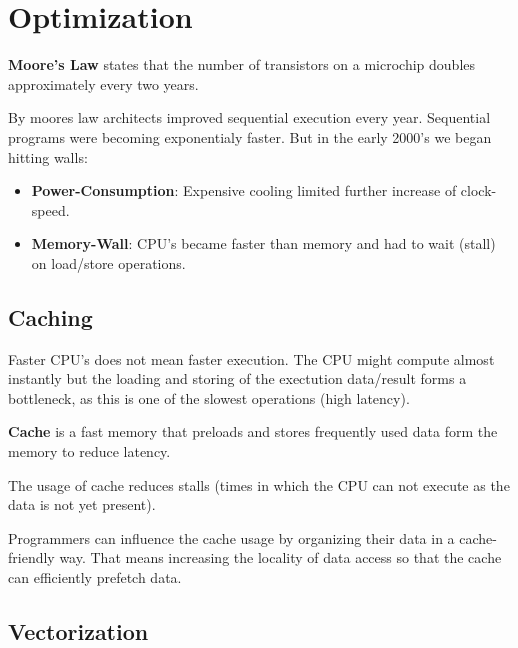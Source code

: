 \section{Optimization}

\begin{theorem}
    \textbf{Moore's Law} states that the number of transistors on a microchip doubles approximately every two years.
\end{theorem}

By moores law architects improved sequential execution every year. Sequential programs were becoming exponentialy faster. 
But in the early 2000's we began hitting walls:

\begin{itemize}
    \item \textbf{Power-Consumption}: Expensive cooling limited further increase of clock-speed.
    \item \textbf{Memory-Wall}: CPU's became faster than memory and had to wait (stall) on load/store operations.
\end{itemize}

\subsection{Caching}

Faster CPU's does not mean faster execution. The CPU might compute almost instantly but the loading and
storing of the exectution data/result forms a bottleneck, as this is one of the slowest operations (high latency).

\begin{definition}
    \textbf{Cache} is a fast memory that preloads and stores frequently used data form the memory to reduce latency.
\end{definition}

The usage of cache reduces stalls (times in which the CPU can not execute as the data is not yet present).

\begin{remark}
    Programmers can influence the cache usage by organizing their data in a cache-friendly way. That means increasing the locality of data access so that the cache can efficiently prefetch data.
\end{remark}

\subsection{Vectorization}

